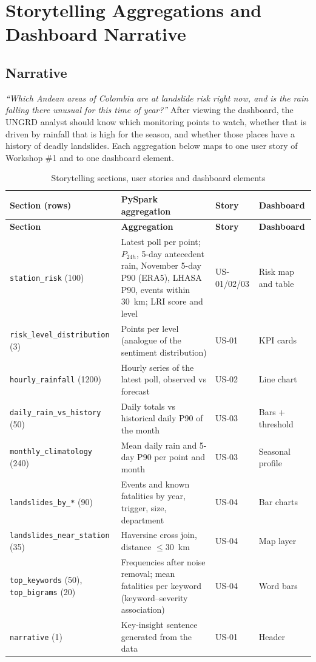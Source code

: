 \documentclass[11pt,a4paper]{article}
\begin{document}
\section{Storytelling Aggregations and Dashboard Narrative}
\subsection{Narrative}
\textit{``Which Andean areas of Colombia are at landslide risk right now, and is the rain falling there unusual for this
time of year?''} After viewing the dashboard, the UNGRD analyst should know which monitoring points to watch, whether
that is driven by rainfall that is high for the season, and whether those places have a history of deadly landslides.
Each aggregation below maps to one user story of Workshop \#1 and to one dashboard element.
\begin{small}\begin{longtable}{p{3.9cm}p{6.2cm}p{1.6cm}p{2.6cm}}
\caption{Storytelling sections, user stories and dashboard elements}\\\toprule
\textbf{Section (rows)} & \textbf{PySpark aggregation} & \textbf{Story} & \textbf{Dashboard}\\\midrule\endfirsthead
\toprule\textbf{Section} & \textbf{Aggregation} & \textbf{Story} & \textbf{Dashboard}\\\midrule\endhead
\texttt{station\_\allowbreak{}risk} (100) & Latest poll per point; $P_{24h}$, 5-day antecedent rain, November 5-day P90 (ERA5), LHASA P90, events within 30~km; LRI score and level & US-01/02/03 & Risk map and table\\
\texttt{risk\_\allowbreak{}level\_\allowbreak{}distribution} (3) & Points per level (analogue of the sentiment distribution) & US-01 & KPI cards\\
\texttt{hourly\_\allowbreak{}rainfall} (1200) & Hourly series of the latest poll, observed vs forecast & US-02 & Line chart\\
\texttt{daily\_\allowbreak{}rain\_\allowbreak{}vs\_\allowbreak{}history} (50) & Daily totals vs historical daily P90 of the month & US-03 & Bars + threshold\\
\texttt{monthly\_\allowbreak{}climatology} (240) & Mean daily rain and 5-day P90 per point and month & US-03 & Seasonal profile\\
\texttt{landslides\_\allowbreak{}by\_\allowbreak{}*} (90) & Events and known fatalities by year, trigger, size, department & US-04 & Bar charts\\
\texttt{landslides\_\allowbreak{}near\_\allowbreak{}station} (35) & Haversine cross join, distance $\le 30$~km & US-04 & Map layer\\
\texttt{top\_\allowbreak{}keywords} (50), \texttt{top\_\allowbreak{}bigrams} (20) & Frequencies after noise removal; mean fatalities per keyword (keyword--severity association) & US-04 & Word bars\\
\texttt{narrative} (1) & Key-insight sentence generated from the data & US-01 & Header\\
\bottomrule\end{longtable}\end{small}
\end{document}
